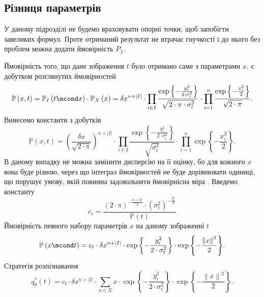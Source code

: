 \subsection{Різниця параметрів}

У даному підрозділі не будемо враховувати опорні точки,
щоб запобігти завеликих формул.
Проте отриманий результат не втрачає гнучкості
і до нього без проблем можна додати ймовірність $P_L$.

Ймовірність того,
що дане зображення $t$ було отримано саме з параметрами $x$,
є добутком розглянутих ймовірностей
\begin{equation*}
  \mathbb{P}\left( x, t \right)
  = \mathbb{P}_I\left( t \mcond x \right)
    \cdot \mathbb{P}_X\left( x \right)
  = \delta x^{n + \left| I \right|} \cdot \prod_{i \in I}
  \frac{\exp{\left\{ - \frac{y_i^2}
       {2 \cdot \sigma_t^2} \right\}}}{\sqrt{2 \cdot \pi \cdot \sigma_t^2}}
  \cdot
  \prod_{i=1}^n
  \frac{\exp{\left\{ - \frac{x_i^2}{2} \right\}}}{\sqrt{2 \cdot \pi}}.
\end{equation*}
Винесемо константи з добутків
\begin{equation*}
  \mathbb{P}\left( x, t \right)
  = \left( \frac{\delta x}{\sqrt{2 \cdot \pi}} \right)^{n + \left| I \right|}
    \cdot \prod_{i \in I}
    \frac{\exp{\left\{ - \frac{y_i^2}
         {2 \cdot \sigma_t^2} \right\}}}{\sqrt{\sigma_t^2}}
    \cdot
    \prod_{i=1}^n
    \exp{\left\{ - \frac{x_i^2}{2} \right\}}.
\end{equation*}
В даному випадку не можна замінити дисперсію на її оцінку,
бо для кожного $x$ вона буде різною,
через що інтеграл ймовірностей не буде дорівнювати одиниці,
що порушує умову, якій повинна задовольняти ймовірнісна міра
\cite{dorogovtsev:1989}.
Введемо константу
\begin{equation*}
  c_t = \frac{
      \left( 2 \cdot \pi \right)^{- \frac{n + \left| I \right|}{2}}
      \cdot \left( \sigma_t^2 \right)^{- \frac{\left| I \right|}{2}}
    }{\mathbb{P}\left( t \right)}
\end{equation*}
Ймовірність певного набору параметрів $x$ на даному зображенні $t$
\begin{equation*}
  \mathbb{P}\left( x \mcond t \right)
  = c_t \cdot \delta x^{n + \left| I \right|}
    \cdot \exp{\left\{ - \frac{y_i^2}{2 \cdot \sigma_t^2} \right\}}
    \cdot \exp{\left\{ - \frac{\left\| x \right\|^2}{2} \right\}}.
\end{equation*}
Стратегія розпізнавання
\begin{equation*}
  q^*_{\theta}\left( t \right)
  = c_t \cdot \delta x^{n + \left| I \right|}
    \cdot \sum_{x \in X}
      x
      \cdot \exp{\left\{ - \frac{y_i^2}{2 \cdot \sigma_t^2} \right\}}
      \cdot \exp{\left\{ - \frac{\left\| x \right\|^2}{2} \right\}}.
\end{equation*}
